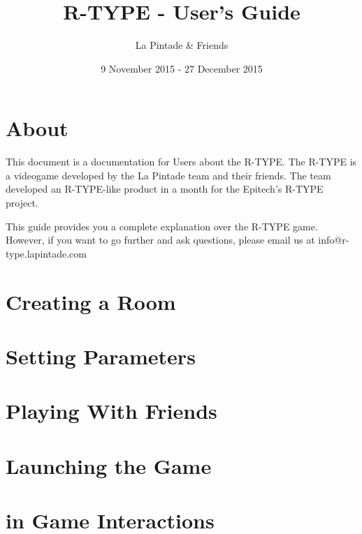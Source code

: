 \documentclass{article}
\title{R-TYPE - User's Guide}
\author{La Pintade \& Friends}
\date{9 November 2015 - 27 December 2015}
\begin{document}
\maketitle
\tableofcontents

\newpage

  \section{About}
  This document is a documentation for Users about the R-TYPE. The R-TYPE is a videogame developed by the La Pintade team and their friends. The team developed an R-TYPE-like product in a month for the Epitech's R-TYPE project.

  \bigskip
  This guide provides you a complete explanation over the R-TYPE game. However, if you want to go further and ask questions, please email us at info@r-type.lapintade.com

  \newpage

  \section{Creating a Room}

  \section{Setting Parameters}

  \section{Playing With Friends}

  \section{Launching the Game}

  \section{in Game Interactions}
\end{document}
